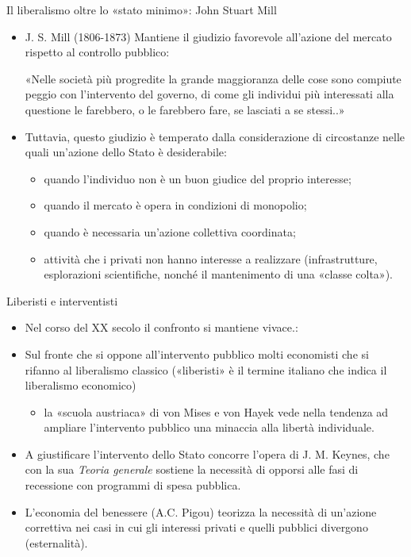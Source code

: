 \documentclass[aspectratio=64,12pt]{beamer}
\begin{document}
\begin{frame}{Il liberalismo oltre lo «stato minimo»: John Stuart Mill}
\begin{itemize}
\item J. S. Mill (1806-1873) Mantiene il giudizio favorevole all’azione del mercato rispetto al controllo pubblico:
\begin{quoting}
\fontsize{10}{11}\selectfont
«Nelle società più progredite la grande maggioranza delle cose sono compiute peggio con l’intervento del governo, di come gli individui più interessati alla questione le farebbero, o le farebbero fare, se lasciati a se stessi..»
\end{quoting}
\item Tuttavia, questo giudizio è temperato dalla considerazione di circostanze nelle quali un’azione dello Stato è desiderabile:
\begin{itemize}
\item quando l’individuo non è un buon giudice del proprio interesse;
\item quando il mercato è opera in condizioni di monopolio;
\item quando è necessaria un’azione collettiva coordinata;
\item attività che i privati non hanno interesse a realizzare (infrastrutture, esplorazioni scientifiche, nonché il mantenimento di una «classe colta»).
\end{itemize}
\end{itemize}
\end{frame}

\begin{frame}{Liberisti e interventisti}
\begin{itemize}
\item Nel corso del XX secolo il confronto si mantiene vivace.:
\item Sul fronte che si oppone all’intervento pubblico molti economisti che si rifanno al liberalismo classico («liberisti» è il termine italiano che indica il liberalismo economico)
\begin{itemize}
\item la «scuola austriaca» di von Mises e von Hayek vede nella tendenza ad ampliare l’intervento pubblico una minaccia alla libertà individuale.
\end{itemize}
\item A giustificare l’intervento dello Stato concorre l’opera di J. M. Keynes, che con la sua \emph{Teoria generale} sostiene la necessità di opporsi alle fasi di recessione con programmi di spesa pubblica.
\item L’economia del benessere (A.C. Pigou) teorizza la necessità di un’azione correttiva nei casi in cui gli interessi privati e quelli pubblici divergono (esternalità).
\end{itemize}
\end{frame}
\end{document}
